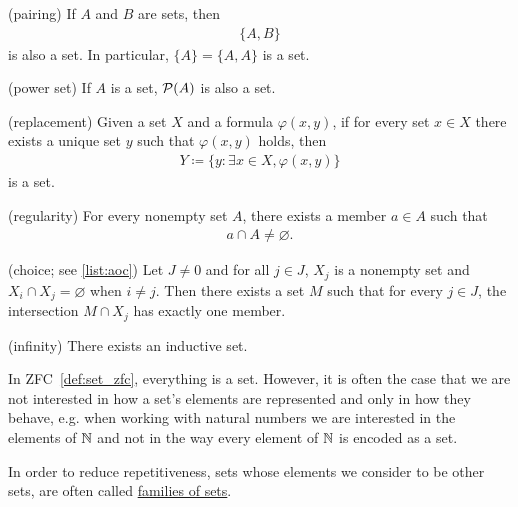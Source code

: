 \begin{definition}
\begin{description}
    (pairing) If $A$ and $B$ are sets, then
    \begin{align*}
      \{ A, B \}
    \end{align*}
    is also a set. In particular, $\{ A \} = \{ A, A \}$ is a set.

    (power set) If $A$ is a set, $\operatorname{\mathcal P}(A)$ is also a set.

    (replacement) Given a set $X$ and a formula $\varphi(x, y)$, if for every set $x \in X$ there exists a unique set $y$ such that $\varphi(x, y)$ holds, then
    \begin{align*}
      Y \coloneqq \{ y \colon \exists x \in X, \varphi(x, y) \}
    \end{align*}
    is a set.

    (regularity) For every nonempty set $A$, there exists a member $a \in A$ such that
    \begin{align*}
      a \cap A \neq \varnothing.
    \end{align*}

    (choice; see \cref{list:aoc}) Let $J \neq 0$ and for all $j \in J$, $X_j$ is a nonempty set and $X_i \cap X_j = \varnothing$ when $i \neq j$. Then there exists a set $M$ such that for every $j \in J$, the intersection $M \cap X_j$ has exactly one member.

    (infinity) There exists an inductive set.
  \end{description}
\end{definition}

\begin{note}\label{note:family_of_sets}
  In ZFC~\cref{def:set_zfc}, everything is a set. However, it is often the case that we are not interested in how a set's elements are represented and only in how they behave, e.g. when working with natural numbers we are interested in the elements of $\mathbb N$ and not in the way every element of $\mathbb N$ is encoded as a set.

  In order to reduce repetitiveness, sets whose elements we consider to be other sets, are often called \uline{families of sets}.
\end{note}

